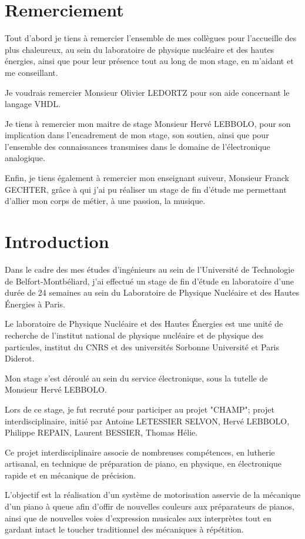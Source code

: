 \documentclass[french,a4paper,12pt]{report}
\begin{document}
  \chapter{Remerciement}
  Tout d'abord je tiens à remercier l'ensemble de mes collègues pour l'accueille des plus chaleureux, au sein du laboratoire de physique nucléaire et des hautes énergies, ainsi que pour leur présence tout au long de mon stage, en m'aidant et me conseillant.
  
  Je voudrais remercier Monsieur Olivier LEDORTZ pour son aide concernant le langage VHDL.
  
  Je tiens à remercier mon maitre de stage Monsieur Hervé LEBBOLO, pour son implication dans l'encadrement de mon stage, son soutien, ainsi que pour l'ensemble des connaissances transmises dans le domaine de l'électronique analogique.
  
  Enfin, je tiens également à remercier mon enseignant suiveur, Monsieur Franck GECHTER, grâce à qui j'ai pu réaliser un stage de fin d'étude me permettant d'allier mon corps de métier, à une passion, la musique.
  
 \chapter{Introduction}

Dans le cadre des mes études d'ingénieurs au sein de l'Université de Technologie de Belfort-Montbéliard, j'ai effectué un stage de fin d'étude en laboratoire d'une durée de 24 semaines au sein du Laboratoire de Physique Nucléaire et des Hautes Énergies à Paris.

Le laboratoire de Physique Nucléaire et des Hautes Énergies est une unité de recherche de l'institut national de  physique nucléaire et de physique des particules, institut du CNRS et des universités Sorbonne Université et Paris Diderot.

Mon stage s'est déroulé au sein du service électronique, sous la tutelle de Monsieur Hervé LEBBOLO.

Lors de ce stage, je fut recruté pour participer au projet "CHAMP"; projet interdisciplinaire, initié par Antoine LETESSIER SELVON, Hervé LEBBOLO, Philippe REPAIN, Laurent BESSIER, Thomas Hélie.

Ce projet interdisciplinaire associe de nombreuses compétences, en lutherie artisanal, en technique de préparation de piano, en physique, en électronique rapide et en mécanique de précision.

L'objectif est la réalisation d'un système de motorisation asservie de la mécanique d'un piano à queue afin d'offir de nouvelles couleurs aux préparateurs de pianos, ainsi que de nouvelles voies d'expression musicales aux interprètes tout en gardant intact le toucher traditionnel des mécaniques à répétition.
\end{document}
